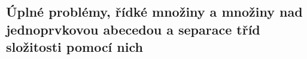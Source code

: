\subsection{Úplné problémy, řídké množiny a množiny nad jednoprvkovou abecedou a separace tříd složitosti pomocí nich}